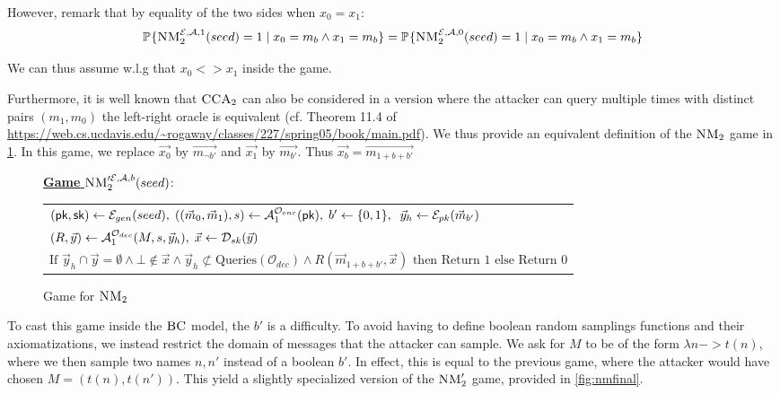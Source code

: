 However, remark that by equality of the two sides when $x_0=x_1$:
\[\mathbb{P}_{}\{\textsc{NM}_2^{\mathcal{E},\mathcal{A},1}(seed) = 1 \mid x_0 = m_b \wedge x_1 = m_b\} = \mathbb{P}_{}\{\textsc{NM}_2^{\mathcal{E},\mathcal{A},0}(seed) = 1  \mid x_0 = m_b \wedge x_1 = m_b\}   \]

We can thus assume w.l.g that $x_0 <> x_1$ inside the game.

Furthermore, it is well known that $\textsc{CCA}_2$ can also be considered in a version where the attacker can query multiple times with distinct pairs $(m_1,m_0)$ the left-right oracle is equivalent (cf. Theorem 11.4 of \url{https://web.cs.ucdavis.edu/~rogaway/classes/227/spring05/book/main.pdf}). We thus provide an equivalent definition of the $\textsc{NM}_2$ game in \cref{fig:nmbis}. In this game, we replace $\vec{x_0}$ by $\vec{m_{\neg b'}}$ and $\vec{x_1}$ by $\vec{m_{b'}}$. Thus $\vec{x_b} = \vec{m_{1+b+b'}}$


\begin{figure}[h!]
  \vspace{-1em}
  \centering

        \underline{\textbf{Game}
        $\textsc{NM}_2'^{\mathcal{E},\mathcal{A},b}(seed)$}: \\
        \begin{tabular}{l}
          $(\textsf{pk},\textsf{sk}) \leftarrow \mathcal{E}_{gen}(seed),\; ((\vec{m}_0,\vec{m}_1),s) \leftarrow \mathcal{A}_1^{\mathcal{O}_{enc}}(\textsf{pk}),\; b'\leftarrow \{0,1\},\;
  \; \vec{y}_h \leftarrow \mathcal{E}_{pk}(\vec{m}_{b'})$\\
          $(R,\vec{y}) \leftarrow \mathcal{A}_1^{\mathcal{O}_{dec}}(M,s,\vec{y}_h),\; \vec{x} \leftarrow \mathcal{D}_{sk}(\vec{y})$ \\
          $\text{If } \vec{y}_h \cap \vec{y} = \emptyset \wedge \bot \notin \vec{x} \wedge \vec{y}_h \not \subset \text{Queries}(\mathcal{O}_{dec}) \wedge R(\vec{m}_{1+b+b'},\vec{x}) \text{ then Return } 1 \text{ else Return } 0$
        \end{tabular}
  \caption{Game for $\textsc{NM}_2$}
  \label{fig:nmbis}
\end{figure}

To cast this game inside the $\textsc{BC}$ model, the $b'$ is a difficulty. To avoid having to define boolean random samplings functions and their axiomatizations, we instead restrict the domain of messages that the attacker can sample. We ask for $M$ to be of the form $\lambda n -> t(n)$, where we then sample two names $n,n'$ instead of a boolean $b'$. In effect, this is equal to the previous game, where the attacker would have chosen $M= ( t(n),t(n'))$. This yield a slightly specialized version of the $\textsc{NM}_2'$ game,  provided in \cref{fig:nmfinal}.


